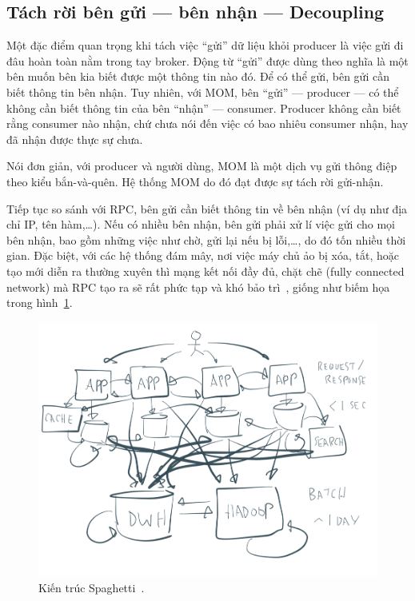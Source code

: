 \documentclass{article}
\begin{document}
\subsection{Tách rời bên gửi --- bên nhận --- Decoupling}

Một đặc điểm quan trọng khi tách việc ``gửi'' dữ liệu khỏi producer là việc gửi
đi đâu hoàn toàn nằm trong tay broker. Động từ ``gửi'' được dùng theo nghĩa là
một bên muốn bên kia biết được một thông tin nào đó. Để có thể gửi, bên gửi cần
biết thông tin bên nhận. Tuy nhiên, với MOM, bên ``gửi'' --- producer --- có thể
không cần biết thông tin của bên ``nhận'' --- consumer. Producer không cần biết
rằng consumer nào nhận, chứ chưa nói đến việc có bao nhiêu consumer nhận, hay đã
nhận được thực sự chưa.

Nói đơn giản, với producer và người dùng, MOM là một dịch vụ gửi thông điệp theo
kiểu bắn-và-quên. Hệ thống MOM do đó đạt được sự tách rời gửi-nhận.

Tiếp tục so sánh với RPC, bên gửi cần biết thông tin về bên nhận (ví dụ như địa
chỉ IP, tên hàm,\ldots). Nếu có nhiều bên nhận, bên gửi phải xử lí việc gửi cho
mọi bên nhận, bao gồm những việc như chờ, gửi lại nếu bị lỗi,\ldots, do đó tốn
nhiều thời gian. Đặc biệt, với các hệ thống đám mây, nơi việc máy chủ ảo bị xóa,
tắt, hoặc tạo mới diễn ra thường xuyên thì mạng kết nối đầy đủ, chặt chẽ (fully
connected network) mà RPC tạo ra sẽ rất phức tạp và khó bảo
trì~\cite{Kleppmann17C}, giống như biếm họa trong
hình~\ref{spaghetti_architectures}.

\begin{figure}[H]
    \centering
    \includegraphics[scale=0.5]{spaghetti_architectures.png}
    \caption{Kiến trúc Spaghetti\texttrademark~\cite{confluent2018}.}\label{spaghetti_architectures}
\end{figure}
\end{document}
